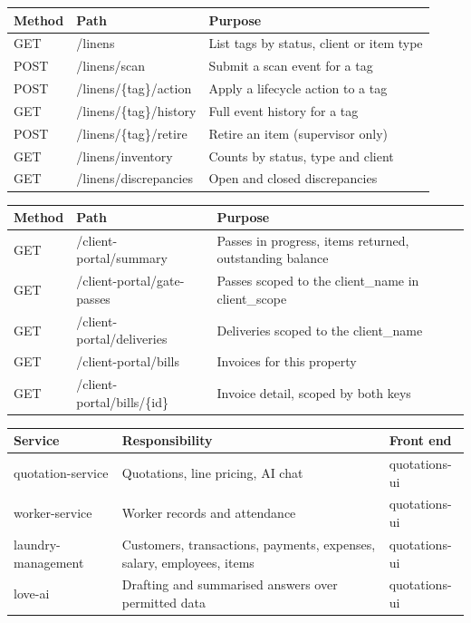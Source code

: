 \documentclass[11pt,a4paper,oneside]{book}
\begin{document}
\begin{center}\small
\begin{tabularx}{\linewidth}{|X|X|X|}
\hline
\rowcolor{lightgrey}
\textbf{Method} & \textbf{Path} & \textbf{Purpose} \\ \hline
GET & /linens & List tags by status, client or item type \\ \hline
POST & /linens/scan & Submit a scan event for a tag \\ \hline
POST & /linens/\{tag\}/action & Apply a lifecycle action to a tag \\ \hline
GET & /linens/\{tag\}/history & Full event history for a tag \\ \hline
POST & /linens/\{tag\}/retire & Retire an item (supervisor only) \\ \hline
GET & /linens/inventory & Counts by status, type and client \\ \hline
GET & /linens/discrepancies & Open and closed discrepancies \\ \hline
\end{tabularx}
\end{center}
\begin{center}\small
\begin{tabularx}{\linewidth}{|X|X|X|}
\hline
\rowcolor{lightgrey}
\textbf{Method} & \textbf{Path} & \textbf{Purpose} \\ \hline
GET & /client-portal/summary & Passes in progress, items returned, outstanding balance \\ \hline
GET & /client-portal/gate-passes & Passes scoped to the client\_name in client\_scope \\ \hline
GET & /client-portal/deliveries & Deliveries scoped to the client\_name \\ \hline
GET & /client-portal/bills & Invoices for this property \\ \hline
GET & /client-portal/bills/\{id\} & Invoice detail, scoped by both keys \\ \hline
\end{tabularx}
\end{center}
\begin{center}\small
\begin{tabularx}{\linewidth}{|X|X|X|}
\hline
\rowcolor{lightgrey}
\textbf{Service} & \textbf{Responsibility} & \textbf{Front end} \\ \hline
quotation-service & Quotations, line pricing, AI chat & quotations-ui \\ \hline
worker-service & Worker records and attendance & quotations-ui \\ \hline
laundry-management & Customers, transactions, payments, expenses, salary, employees, items & quotations-ui \\ \hline
love-ai & Drafting and summarised answers over permitted data & quotations-ui \\ \hline
\end{tabularx}
\end{center}
\end{document}
